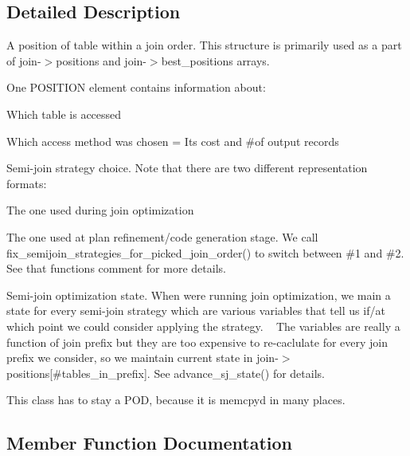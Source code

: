 \subsection{Detailed Description}
A position of table within a join order. This structure is primarily used as a part of join-\/$>$positions and join-\/$>$best\+\_\+positions arrays.

One P\+O\+S\+I\+T\+I\+ON element contains information about\+:
\begin{DoxyItemize}
\item Which table is accessed
\item Which access method was chosen = Its cost and \#of output records
\item Semi-\/join strategy choice. Note that there are two different representation formats\+:
\begin{DoxyEnumerate}
\item The one used during join optimization
\item The one used at plan refinement/code generation stage. We call fix\+\_\+semijoin\+\_\+strategies\+\_\+for\+\_\+picked\+\_\+join\+\_\+order() to switch between \#1 and \#2. See that function\textquotesingle{}s comment for more details.
\end{DoxyEnumerate}
\item Semi-\/join optimization state. When we\textquotesingle{}re running join optimization, we main a state for every semi-\/join strategy which are various variables that tell us if/at which point we could consider applying the strategy. ~\newline
 The variables are really a function of join prefix but they are too expensive to re-\/caclulate for every join prefix we consider, so we maintain current state in join-\/$>$positions\mbox{[}\#tables\+\_\+in\+\_\+prefix\mbox{]}. See advance\+\_\+sj\+\_\+state() for details.
\end{DoxyItemize}

This class has to stay a P\+OD, because it is memcpy\textquotesingle{}d in many places. 

\subsection{Member Function Documentation}
\mbox{\label{structst__position_a2ebb88c3230d471f89bda02de12f62e6}} 
